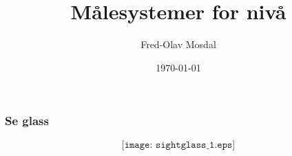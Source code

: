 \documentclass[aspectratio=169,xcolor=dvipsnames]{beamer}
\title[Temperatur]{Målesystemer for nivå} %
\author[Fred-Olav] {Fred-Olav Mosdal}
\institute[Gand VGS] %
{
    Gand VGS \\
    VG3 Automasjon
}
\date{\today} %
\begin{document}
\begin{frame}
\titlepage
\end{frame}


%
%
%
%
%
%
%
%
\begin{frame}
	\frametitle{Se glass}

$$\texttt{[image: sightglass\_1.eps]}$$
\end{frame}
\end{document}
